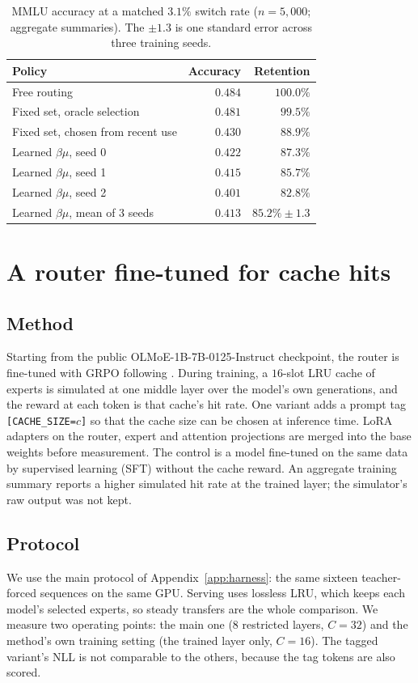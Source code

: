 \documentclass{article}
\begin{document}
\begin{table}[h]
\centering
\caption{MMLU accuracy at a matched $3.1\%$ switch rate ($n{=}5{,}000$;
aggregate summaries). The $\pm1.3$ is one standard error across three
training seeds.}
\label{tab:mmlu}
\small
\begin{tabular}{lrr}
\toprule
Policy & Accuracy & Retention \\
\midrule
Free routing & $0.484$ & $100.0\%$ \\
Fixed set, oracle selection & $0.481$ & $99.5\%$ \\
Fixed set, chosen from recent use & $0.430$ & $88.9\%$ \\
Learned $\beta\mu$, seed 0 & $0.422$ & $87.3\%$ \\
Learned $\beta\mu$, seed 1 & $0.415$ & $85.7\%$ \\
Learned $\beta\mu$, seed 2 & $0.401$ & $82.8\%$ \\
\midrule
Learned $\beta\mu$, mean of 3 seeds & $0.413$ & $85.2\% \pm 1.3$ \\
\bottomrule
\end{tabular}
\end{table}

\section{A router fine-tuned for cache hits}
\label{app:workingset}

\subsection{Method}
Starting from the public OLMoE-1B-7B-0125-Instruct
checkpoint, the router is fine-tuned with GRPO \citep{shao2024deepseekmath}
following \citet{carmoe2026}. During training, a $16$-slot LRU cache of
experts is simulated at one middle layer over the model's own generations,
and the reward at each token is that cache's hit rate. One variant adds a
prompt tag \texttt{[CACHE\_SIZE=$c$]} so that the cache size can be chosen at
inference time. LoRA adapters on the router, expert and attention
projections are merged into the base weights before measurement. The control
is a model fine-tuned on the same data by supervised learning (SFT) without
the cache reward. An aggregate training summary reports a higher simulated
hit rate at the trained layer; the simulator's raw output was not kept.

\subsection{Protocol}
We use the main protocol of
Appendix~\ref{app:harness}: the same sixteen teacher-forced sequences on the
same GPU. Serving uses lossless LRU, which keeps each model's selected
experts, so steady transfers are the whole comparison. We measure two
operating points: the main one ($8$ restricted layers, $C{=}32$) and the
method's own training setting (the trained layer only, $C{=}16$). The tagged
variant's NLL is not comparable to the others, because the tag tokens are
also scored.
\end{document}
